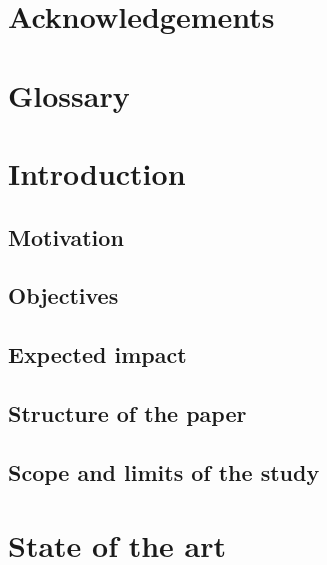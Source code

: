 \documentclass[11pt,english,listoffigures,listoftables, listofalgorithms]{tfgetsinf}
\begin{document}
\chapter{Acknowledgements}

\chapter{Glossary}


\mainmatter


\chapter{Introduction}
\label{chap:introduction}
\section{Motivation}
\section{Objectives}
\section{Expected impact}
\section{Structure of the paper}
\section{Scope and limits of the study}


\chapter{State of the art}
\label{chap:sota}
\end{document}
